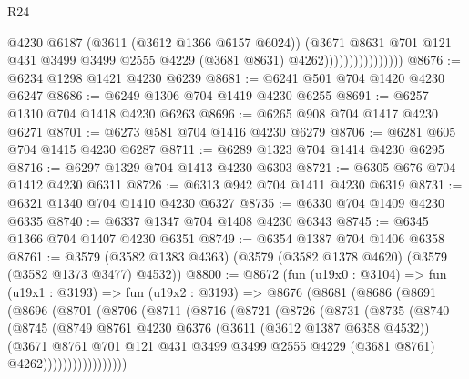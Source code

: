 \begin{lexlean}{R24}
\begin{coremodule}
                                  @4230
                                  @6187
                                  (@3611 (@3612 @1366 @6157 @6024))
                                  (@3671
                                    @8631
                                    @701
                                    @121
                                    @431
                                    @3499
                                    @3499
                                    @2555
                                    @4229
                                    (@3681 @8631)
                                    @4262))))))))))))))))
@8676 := @6234 @1298 @1421 @4230 @6239
@8681 := @6241 @501 @704 @1420 @4230 @6247
@8686 := @6249 @1306 @704 @1419 @4230 @6255
@8691 := @6257 @1310 @704 @1418 @4230 @6263
@8696 := @6265 @908 @704 @1417 @4230 @6271
@8701 := @6273 @581 @704 @1416 @4230 @6279
@8706 := @6281 @605 @704 @1415 @4230 @6287
@8711 := @6289 @1323 @704 @1414 @4230 @6295
@8716 := @6297 @1329 @704 @1413 @4230 @6303
@8721 := @6305 @676 @704 @1412 @4230 @6311
@8726 := @6313 @942 @704 @1411 @4230 @6319
@8731 := @6321 @1340 @704 @1410 @4230 @6327
@8735 := @6330 @704 @1409 @4230 @6335
@8740 := @6337 @1347 @704 @1408 @4230 @6343
@8745 := @6345 @1366 @704 @1407 @4230 @6351
@8749 := @6354 @1387 @704 @1406 @6358
@8761 := @3579 (@3582 @1383 @4363) (@3579 (@3582 @1378 @4620) (@3579 (@3582 @1373 @3477) @4532))
@8800 := @8672
    (fun (u19x0 : @3104) =>
    fun (u19x1 : @3193) =>
    fun (u19x2 : @3193) =>
    @8676
      (@8681
        (@8686
          (@8691
            (@8696
              (@8701
                (@8706
                  (@8711
                    (@8716
                      (@8721
                        (@8726
                          (@8731
                            (@8735
                              (@8740
                                (@8745
                                  (@8749
                                    @8761
                                    @4230
                                    @6376
                                    (@3611 (@3612 @1387 @6358 @4532))
                                    (@3671
                                      @8761
                                      @701
                                      @121
                                      @431
                                      @3499
                                      @3499
                                      @2555
                                      @4229
                                      (@3681 @8761)
                                      @4262)))))))))))))))))

\end{coremodule}
\end{lexlean}
